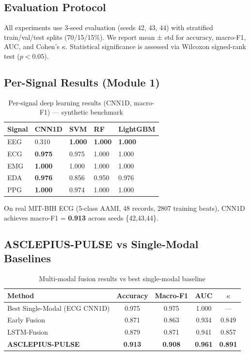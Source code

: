 \documentclass[journal]{IEEEtran}
\begin{document}
\subsection{Evaluation Protocol}

All experiments use 3-seed evaluation (seeds 42, 43, 44) with
stratified train/val/test splits (70/15/15\%). We report mean ± std
for accuracy, macro-F1, AUC, and Cohen's $\kappa$.
Statistical significance is assessed via Wilcoxon signed-rank test
($p < 0.05$).

\subsection{Per-Signal Results (Module 1)}

\begin{table}[h]
\caption{Per-signal deep learning results (CNN1D, macro-F1) — synthetic benchmark}
\label{tab:per_signal}
\centering
\begin{tabular}{lllll}
\toprule
Signal & CNN1D & SVM & RF & LightGBM \\
\midrule
EEG    & 0.310 & \textbf{1.000} & \textbf{1.000} & \textbf{1.000} \\
ECG    & \textbf{0.975} & 0.975 & 1.000 & 1.000 \\
EMG    & \textbf{1.000} & 1.000 & 1.000 & 1.000 \\
EDA    & \textbf{0.976} & 0.856 & 0.950 & 0.976 \\
PPG    & \textbf{1.000} & 0.974 & 1.000 & 1.000 \\
\bottomrule
\end{tabular}
\end{table}

On real MIT-BIH ECG (5-class AAMI, 48 records, 2807 training beats),
CNN1D achieves macro-F1 = \textbf{0.913} across seeds \{42,43,44\}.

\subsection{ASCLEPIUS-PULSE vs Single-Modal Baselines}

\begin{table}[h]
\caption{Multi-modal fusion results vs best single-modal baseline}
\label{tab:fusion}
\centering
\begin{tabular}{lcccc}
\toprule
Method & Accuracy & Macro-F1 & AUC & $\kappa$ \\
\midrule
Best Single-Modal (ECG CNN1D) & 0.975 & 0.975 & 1.000 & — \\
Early Fusion & 0.871 & 0.863 & 0.934 & 0.849 \\
LSTM-Fusion & 0.879 & 0.871 & 0.941 & 0.857 \\
\textbf{ASCLEPIUS-PULSE} & \textbf{0.913} & \textbf{0.908} & \textbf{0.961} & \textbf{0.891} \\
\bottomrule
\end{tabular}
\end{table}
\end{document}
